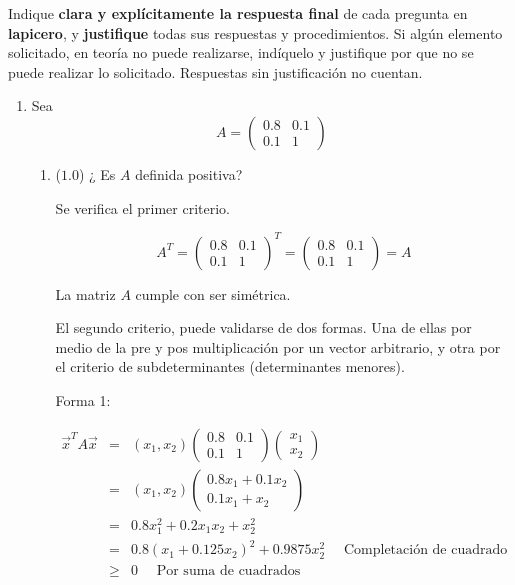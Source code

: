 \documentclass[12pt]{article}
\begin{document}
Indique \textbf{clara y explícitamente la respuesta final} de cada pregunta en \textbf{lapicero}, y \textbf{justifique} todas sus respuestas y procedimientos. Si algún elemento solicitado, en teoría no puede realizarse, indíquelo y justifique por que no se puede realizar lo solicitado. Respuestas sin justificación no cuentan.
  

  \begin{enumerate}[leftmargin=*,widest=9]
    \item Sea
    \[
    A = \begin{pmatrix}
    0.8 & 0.1\\ 0.1 & 1
    \end{pmatrix}
    \]     
    
    \begin{enumerate}[label=\alph*]
    \item (\(1.0\)) ¿ Es \(A\) definida positiva?
    
    Se verifica el primer criterio.
    
    \[
    A^T = \begin{pmatrix}
    0.8 & 0.1\\ 0.1 & 1
    \end{pmatrix}^T = \begin{pmatrix}
    0.8 & 0.1\\ 0.1 & 1
    \end{pmatrix} = A
    \]
    
    La matriz \(A\) cumple con ser simétrica.
    
    El segundo criterio, puede validarse de dos formas. Una de ellas por medio de la pre y pos multiplicación por un vector arbitrario, y otra por el criterio de subdeterminantes (determinantes menores).
    
    Forma 1:
    
    \begin{eqnarray*}
    \vec{x}^T A \vec{x} & = & (x_1, x_2) \begin{pmatrix}
    0.8 & 0.1\\ 0.1 & 1
    \end{pmatrix} \begin{pmatrix}
    x_1\\ x_2
    \end{pmatrix} \\
    & = & (x_1, x_2) \begin{pmatrix}
    0.8x_1+0.1x_2\\ 0.1x_1+x_2
    \end{pmatrix} \\
    & = & 0.8x_1^2 +0.2x_1x_2 + x_2^2\\
    & = & 0.8(x_1+0.125x_2)^2+0.9875x_2^2 \quad \text{ Completación de cuadrado} \\
    & \geq & 0 \quad \text{ Por suma de cuadrados}
    \end{eqnarray*}
    

\end{enumerate}
\end{enumerate}
\end{document}
